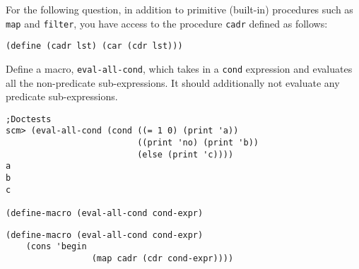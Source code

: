 \begin{blocksection}
\vspace*{.25cm}
For the following question, in addition to primitive (built-in) procedures such as \texttt{map} and \texttt{filter}, you have access to the procedure \texttt{cadr} defined as follows:

\begin{lstlisting}
(define (cadr lst) (car (cdr lst)))
\end{lstlisting}
\end{blocksection}

\begin{blocksection}
\question Define a macro, \texttt{eval-all-cond}, which takes in a \texttt{cond} expression and evaluates all the non-predicate sub-expressions. It should additionally not evaluate any predicate sub-expressions.
\begin{lstlisting}
;Doctests
scm> (eval-all-cond (cond ((= 1 0) (print 'a))
                          ((print 'no) (print 'b))
                          (else (print 'c))))
a
b
c

(define-macro (eval-all-cond cond-expr)
\end{lstlisting}


\begin{solution}[1in]
\begin{lstlisting}
(define-macro (eval-all-cond cond-expr)
    (cons 'begin
                 (map cadr (cdr cond-expr))))
\end{lstlisting}
\end{solution}
\end{blocksection}
